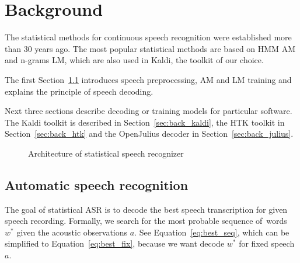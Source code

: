 \chapter{Background}
\label{cha:background}

% 
% 

The statistical methods for continuous speech recognition were established more than 30 years ago. 
The most popular statistical methods are based on \ac{HMM} \acl{AM} and n-grams \ac{LM},
which are also used in Kaldi, the toolkit of our choice.

The first Section~\ref{sec:back_asr} introduces speech preprocessing, \ac{AM} and \ac{LM} training
and explains the principle of speech decoding.

Next three sections describe decoding or training models for particular software.
The Kaldi toolkit is described in Section~\ref{sec:back_kaldi}, 
the \ac{HTK} toolkit in Section~\ref{sec:back_htk} and 
the OpenJulius decoder in Section~\ref{sec:back_julius}.

\begin{figure}[!htp]
    \begin{center}
    
    \caption{Architecture of statistical speech recognizer\cite{ney1990acoustic}}
    \label{fig:components} 
    \end{center}
\end{figure}

\section{Automatic speech recognition}
\label{sec:back_asr}

The goal of statistical \ac{ASR} is to decode 
the best speech transcription for given speech recording.
Formally, we search for the most probable sequence of~words $w^*$ given the acoustic observations $a$.
See Equation~\ref{eq:best_seq}, which can be simplified to Equation~\ref{eq:best_fix},
because we want decode $w^*$ for fixed speech $a$.

